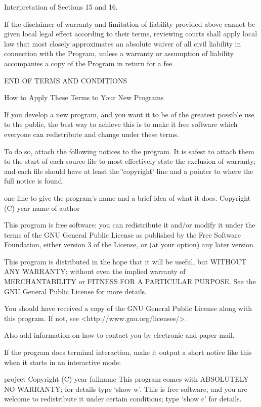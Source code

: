 \begin{DoxyEnumerate}
\item Interpretation of Sections 15 and 16.
\end{DoxyEnumerate}

If the disclaimer of warranty and limitation of liability provided above cannot be given local legal effect according to their terms, reviewing courts shall apply local law that most closely approximates an absolute waiver of all civil liability in connection with the Program, unless a warranty or assumption of liability accompanies a copy of the Program in return for a fee. \begin{DoxyVerb}                 END OF TERMS AND CONDITIONS

        How to Apply These Terms to Your New Programs
\end{DoxyVerb}


If you develop a new program, and you want it to be of the greatest possible use to the public, the best way to achieve this is to make it free software which everyone can redistribute and change under these terms.

To do so, attach the following notices to the program. It is safest to attach them to the start of each source file to most effectively state the exclusion of warranty; and each file should have at least the \char`\"{}copyright\char`\"{} line and a pointer to where the full notice is found. \begin{DoxyVerb}{one line to give the program's name and a brief idea of what it does.}
Copyright (C) {year}  {name of author}

This program is free software: you can redistribute it and/or modify
it under the terms of the GNU General Public License as published by
the Free Software Foundation, either version 3 of the License, or
(at your option) any later version.

This program is distributed in the hope that it will be useful,
but WITHOUT ANY WARRANTY; without even the implied warranty of
MERCHANTABILITY or FITNESS FOR A PARTICULAR PURPOSE.  See the
GNU General Public License for more details.

You should have received a copy of the GNU General Public License
along with this program.  If not, see <http://www.gnu.org/licenses/>.
\end{DoxyVerb}


Also add information on how to contact you by electronic and paper mail.

If the program does terminal interaction, make it output a short notice like this when it starts in an interactive mode\+: \begin{DoxyVerb}{project}  Copyright (C) {year}  {fullname}
This program comes with ABSOLUTELY NO WARRANTY; for details type `show w'.
This is free software, and you are welcome to redistribute it
under certain conditions; type `show c' for details.
\end{DoxyVerb}



